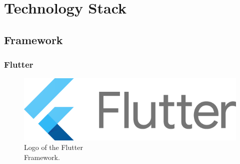 \section{Technology Stack}

\subsection{Framework}
\subsubsection{Flutter}

\begin{figure} %
    \captionsetup{font=footnotesize}
    \centering
    \includegraphics[width=\linewidth]{images/flutter.png}
    \caption{Logo of the Flutter\\Framework.}
\end{figure}

